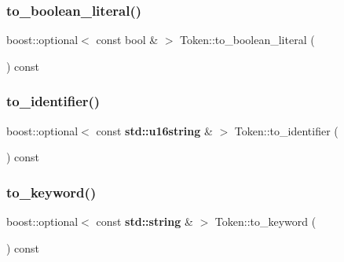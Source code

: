 \mbox{\label{class_token_a1be97c731f423827dd4725de8eb2a41f}} 
\subsubsection{\texorpdfstring{to\+\_\+boolean\+\_\+literal()}{to\_boolean\_literal()}}
{\footnotesize\ttfamily boost\+::optional$<$ const bool \& $>$ Token\+::to\+\_\+boolean\+\_\+literal (\begin{DoxyParamCaption}{ }\end{DoxyParamCaption}) const}

\mbox{\label{class_token_a26d2e0e166ea03a4a7c2a7b77d456283}} 
\subsubsection{\texorpdfstring{to\+\_\+identifier()}{to\_identifier()}}
{\footnotesize\ttfamily boost\+::optional$<$ const \textbf{ std\+::u16string} \& $>$ Token\+::to\+\_\+identifier (\begin{DoxyParamCaption}{ }\end{DoxyParamCaption}) const}

\mbox{\label{class_token_a4438811e8b488dc71a8ae518368cc962}} 
\subsubsection{\texorpdfstring{to\+\_\+keyword()}{to\_keyword()}}
{\footnotesize\ttfamily boost\+::optional$<$ const \textbf{ std\+::string} \& $>$ Token\+::to\+\_\+keyword (\begin{DoxyParamCaption}{ }\end{DoxyParamCaption}) const}

\mbox{\label{class_token_a6f9a344002940cb1ee6e29a7ae9a178a}} 
